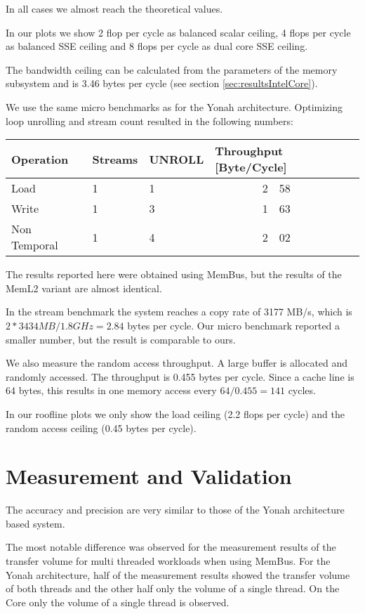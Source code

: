 \documentclass[a4paper,12pt]{report}
\begin{document}
In all cases we almost reach the theoretical values.

In our plots we show 2 flop per cycle as balanced scalar ceiling, 4 flops
per cycle as balanced SSE ceiling and 8 flops per cycle as dual core SSE
ceiling.

The bandwidth ceiling can be calculated from the parameters of the memory
subsystem and is 3.46 bytes per cycle (see section
\ref{sec:resultsIntelCore}).

We use the same micro benchmarks as for the Yonah architecture. Optimizing loop
unrolling and stream count resulted in  the following numbers:

\begin{center}
\begin{tabular}{lllr@{.}l}
\toprule
Operation & Streams & UNROLL &  \multicolumn{2}{l}{Throughput
[Byte/Cycle]} \\
\midrule
Load  &  1 & 1 & 2&58\\
Write &  1 & 3 & 1&63\\
Non Temporal & 1 & 4 & 2&02\\
\bottomrule
\end{tabular}
\end{center}

The results reported here were obtained using MemBus, but the results of the
MemL2 variant are almost identical.
 
In the stream benchmark \cite{stream} the system reaches a copy rate of 3177
MB/s, which is $2*3434MB/1.8GHz=2.84$ bytes per cycle. Our micro benchmark
reported a smaller number, but the result is comparable to ours.

We also measure the random access throughput. A large buffer is allocated and
randomly accessed. The throughput is 0.455 bytes per cycle. Since a cache line is
64 bytes, this results in one memory access every $64/0.455=141$ cycles.

In our roofline plots we only show the load ceiling (2.2 flops per cycle) and
the random access ceiling (0.45 bytes per cycle).

\section{Measurement and Validation}
The accuracy and precision are very similar to those of the Yonah architecture
based system. 

The most notable difference was observed for the measurement results of the
transfer volume for multi threaded workloads when using MemBus. For the Yonah
architecture, half of the measurement results showed the transfer volume of both
threads and the other half only the volume of a single thread. On the Core only
the volume of a single thread is observed.
\end{document}
